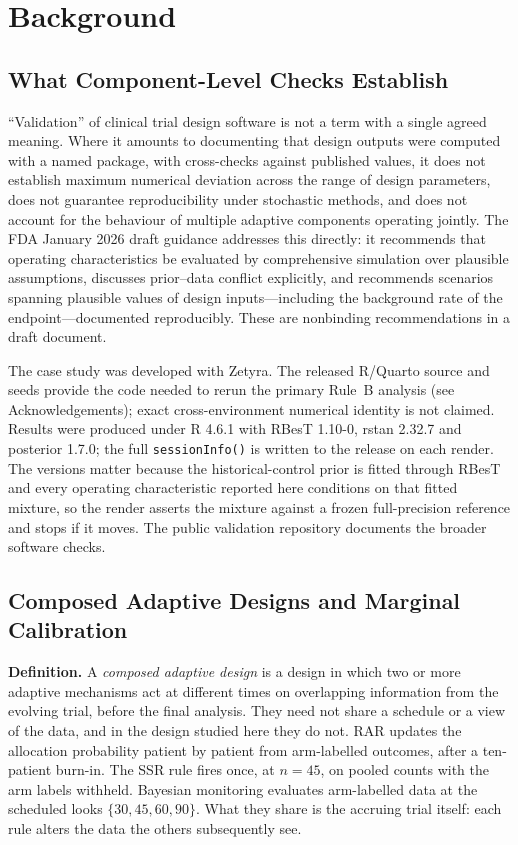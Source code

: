 \documentclass[11pt]{article}
\begin{document}
\section{Background}

\subsection{What Component-Level Checks Establish}

``Validation'' of clinical trial design software is not a term with a single
agreed meaning.  Where it amounts to documenting that design outputs were
computed with a named package, with cross-checks against published values, it
does not establish maximum numerical deviation across the range of design
parameters, does not guarantee reproducibility under stochastic methods, and
does not account for the behaviour of multiple adaptive components operating
jointly.  The FDA January 2026 draft guidance addresses this directly: it recommends
that operating characteristics be evaluated by comprehensive simulation over
plausible assumptions, discusses prior--data conflict explicitly, and
recommends scenarios spanning plausible values of design inputs---including the
background rate of the endpoint---documented reproducibly.  These are nonbinding
recommendations in a draft document.

The case study was developed with Zetyra.  The released R/Quarto source and
seeds provide the code needed to rerun the primary Rule~B analysis (see
Acknowledgements); exact cross-environment numerical identity is not claimed.
Results were produced under R 4.6.1 with RBesT 1.10-0, rstan 2.32.7 and
posterior 1.7.0; the full \texttt{sessionInfo()} is written to the release on
each render.  The versions matter because the historical-control prior is
fitted through RBesT and every operating characteristic reported here
conditions on that fitted mixture, so the render asserts the mixture against a
frozen full-precision reference and stops if it moves.
The public validation repository documents the broader software checks.

\subsection{Composed Adaptive Designs and Marginal Calibration}
\label{sec:composed-defn}

\textbf{Definition.}  A \emph{composed adaptive design} is a design in which two
or more adaptive mechanisms act at different times on overlapping information
from the evolving trial, before the final analysis.  They need not share a
schedule or a view of the data, and in the design studied here they do not.
RAR updates the allocation probability patient by patient from arm-labelled
outcomes, after a ten-patient burn-in.  The SSR rule fires once, at $n=45$, on
pooled counts with the arm labels withheld.  Bayesian monitoring evaluates
arm-labelled data at the scheduled looks $\{30,45,60,90\}$.  What they share is
the accruing trial itself: each rule alters the data the others subsequently
see.
\end{document}
